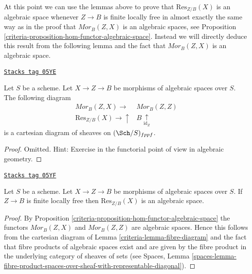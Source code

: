 At this point we can use the lemmas above to prove that $\text{Res}_{Z/B}(X)$
is an algebraic space whenever $Z \to B$ is finite locally free in almost
exactly the same way as in the proof that $\mathit{Mor}_B(Z, X)$ is an
algebraic spaces, see
Proposition \ref{criteria-proposition-hom-functor-algebraic-space}.
Instead we will directly deduce this result from the following lemma
and the fact that $\mathit{Mor}_B(Z, X)$ is an algebraic space.

\begin{lemma}
\label{criteria-lemma-fibre-diagram}
\href{https://stacks.math.columbia.edu/tag/05YE}{\texttt{Stacks tag 05YE}}

Let $S$ be a scheme. Let $X \to Z \to B$ be morphisms of
algebraic spaces over $S$. The following diagram
$$
\begin{array}{cc}\mathit{Mor}_B(Z, X) \longrightarrow & \mathit{Mor}_B(Z, Z) \\ \text{Res}_{Z/B}(X) \longrightarrow\uparrow & B \underset{\text{id}_Z}{\uparrow}\end{array}
$$
is a cartesian diagram of sheaves on $(\Sch/S)_{fppf}$.
\end{lemma}

\begin{proof}
Omitted. Hint: Exercise in the functorial point of view in algebraic
geometry.
\end{proof}

\begin{proposition}
\label{criteria-proposition-restriction-of-scalars-algebraic-space}
\href{https://stacks.math.columbia.edu/tag/05YF}{\texttt{Stacks tag 05YF}}

Let $S$ be a scheme. Let $X \to Z \to B$ be morphisms of
algebraic spaces over $S$. If $Z \to B$ is finite locally free
then $\text{Res}_{Z/B}(X)$ is an algebraic space.
\end{proposition}

\begin{proof}

By
Proposition \ref{criteria-proposition-hom-functor-algebraic-space}
the functors $\mathit{Mor}_B(Z, X)$ and $\mathit{Mor}_B(Z, Z)$
are algebraic spaces. Hence this follows from the cartesian
diagram of
Lemma \ref{criteria-lemma-fibre-diagram}
and the fact that fibre products of algebraic spaces exist and
are given by the fibre product in the underlying category of
sheaves of sets (see
Spaces, Lemma
\ref{spaces-lemma-fibre-product-spaces-over-sheaf-with-representable-diagonal}).
\end{proof}

